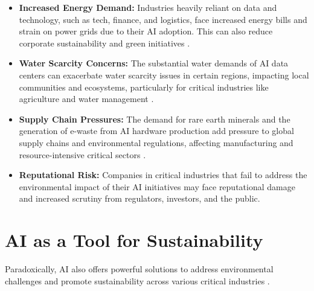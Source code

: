 \begin{itemize}
    \item \textbf{Increased Energy Demand:} Industries heavily reliant on data and technology, such as tech, finance, and logistics, face increased energy bills and strain on power grids due to their AI adoption. This can also reduce corporate sustainability and green initiatives \parencite{IntegrityEnergy2023}.
    \item \textbf{Water Scarcity Concerns:} The substantial water demands of AI data centers can exacerbate water scarcity issues in certain regions, impacting local communities and ecosystems, particularly for critical industries like agriculture and water management \parencite{Li2023}.
    \item \textbf{Supply Chain Pressures:} The demand for rare earth minerals and the generation of e-waste from AI hardware production add pressure to global supply chains and environmental regulations, affecting manufacturing and resource-intensive critical sectors \parencite{EarthOrg2023}.
    \item \textbf{Reputational Risk:} Companies in critical industries that fail to address the environmental impact of their AI initiatives may face reputational damage and increased scrutiny from regulators, investors, and the public.
\end{itemize}

\section{AI as a Tool for Sustainability}
\label{sec:ai_for_sustainability}
Paradoxically, AI also offers powerful solutions to address environmental challenges and promote sustainability across various critical industries \parencite{IBM2023Sustainability}.

